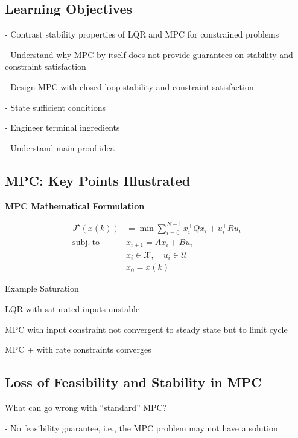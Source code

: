 \subsection{Learning Objectives}

- Contrast stability properties of LQR and MPC for constrained problems

- Understand why MPC by itself does not provide guarantees
on stability and constraint satisfaction

- Design MPC with closed-loop stability and constraint satisfaction

- State sufficient conditions

- Engineer terminal ingredients

- Understand main proof idea

\subsection{MPC: Key Points Illustrated}


\begin{sstTitleBox}[ForestGreen]{\textbf{\large
			MPC Mathematical Formulation
		}}

	\[\begin{aligned}
			J^\star(x(k))         & = \min \textstyle\sum_{i=0}^{N-1}
			x_i^\top Q x_i + u_i^\top R u_i                                        \\
			\mathrm{subj.\ to }\  & x_{i+1} = Ax_i + Bu_i                          \\
			                      & x_i \in \mathcal{X}, \quad u_i \in \mathcal{U} \\
			                      & x_0 = x(k)
		\end{aligned}\]

\end{sstTitleBox}

Example Saturation

LQR with saturated inputs unstable

MPC with input constraint not convergent to steady state but to limit cycle

MPC + with rate constraints converges

\subsection{Loss of Feasibility and Stability in MPC}

What can go wrong with “standard” MPC?

- No feasibility guarantee, i.e., the MPC problem may not have a solution

